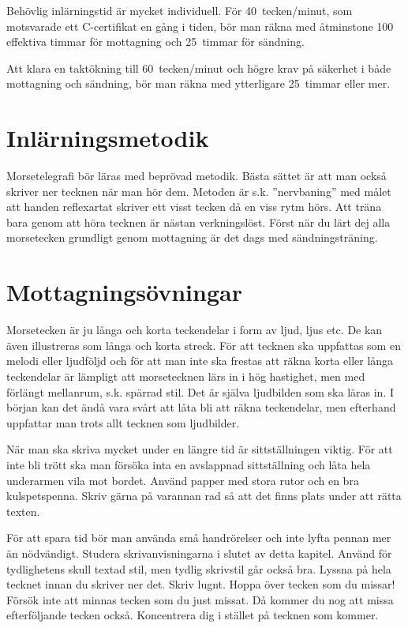 Behövlig inlärningstid är mycket individuell.
För 40~tecken/minut, som motsvarade ett C-certifikat en gång i tiden, bör man
räkna med åtminstone 100 effektiva timmar för mottagning och 25~timmar för
sändning.

Att klara en taktökning till 60~tecken/minut och högre krav på säkerhet i både
mottagning och sändning, bör man räkna med ytterligare 25~timmar eller mer.

\section{Inlärningsmetodik}

Morsetelegrafi bör läras med beprövad metodik.
Bästa sättet är att man också skriver ner tecknen när man hör dem.
Metoden är s.k. ''nervbaning'' med målet att handen reflexartat skriver ett
visst tecken då en viss rytm hörs.
Att träna bara genom att höra tecknen är nästan verkningslöst.
Först när du lärt dej alla morsetecken grundligt genom mottagning är det dags
med sändningsträning.

\section{Mottagnings\-övningar}

Morsetecken är ju långa och korta teckendelar i form av ljud, ljus etc.
De kan även illustreras som långa och korta streck.
För att tecknen ska uppfattas som en melodi eller ljudföljd och för att man
inte ska frestas att räkna korta eller långa teckendelar är lämpligt att
morsetecknen lärs in i hög hastighet, men med förlängt mellanrum, s.k.
spärrad stil.
Det är själva ljudbilden som ska läras in.
I början kan det ändå vara svårt att låta bli att räkna teckendelar, men
efterhand uppfattar man trots allt tecknen som ljudbilder.

När man ska skriva mycket under en längre tid är sittställningen viktig.
För att inte bli trött ska man försöka inta en avslappnad sittställning och låta
hela underarmen vila mot bordet.
Använd papper med stora rutor och en bra kulspetspenna.
Skriv gärna på varannan rad så att det finns plats under att rätta texten.

För att spara tid bör man använda små handrörelser och inte lyfta pennan mer än
nödvändigt.
Studera skrivanvisningarna i slutet av detta kapitel.
Använd för tydlighetens skull textad stil, men tydlig skrivstil går också bra.
Lyssna på hela tecknet innan du skriver ner det.
Skriv lugnt.
Hoppa över tecken som du missar!
Försök inte att minnas tecken som du just missat.
Då kommer du nog att missa efterföljande tecken också.
Koncentrera dig i stället på tecknen som kommer.

